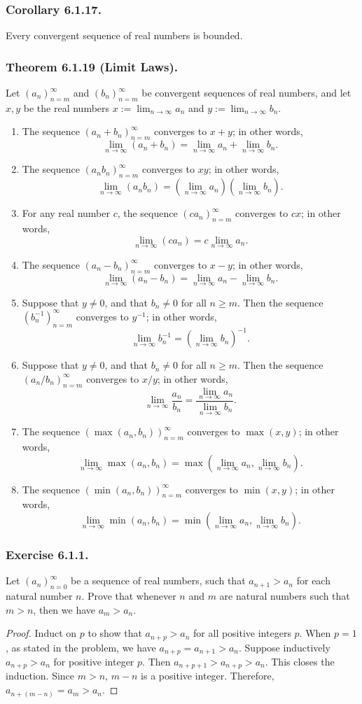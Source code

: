 \documentclass[12pt, letter]{article}
\newcommand{\la}{\lim_{n\to\infty}a_n}
\newcommand{\lb}{\lim_{n\to\infty}b_n}
\begin{document}
\subsubsection*{Corollary 6.1.17.}
Every convergent sequence of real numbers is bounded.
\subsubsection*{Theorem 6.1.19 (Limit Laws).}
Let $(a_n)_{n=m}^\infty$ and $(b_n)_{n=m}^\infty$ be convergent sequences of real numbers, and let $x,y$ be the real numbers $x:=\la$ and $y:=\lb$.
\begin{enumerate}[label=(\alph*)]
    \item  The sequence $(a_n+b_n)_{n=m}^\infty$ converges to $x+y$; in other words, $$\lim_{n\to\infty}(a_n+b_n)=\la+\lb.$$
    \item The sequence $(a_n b_n)_{n=m}^\infty$ converges to $xy$; in other words, $$\lim_{n\to\infty}(a_n b_n)=(\la)(\lb).$$
    \item For any real number $c$, the sequence $(ca_n)_{n=m}^\infty$ converges to $cx$; in other words, $$\lim_{n\to\infty}(ca_n)=c\la.$$
    \item The sequence $(a_n-b_n)_{n=m}^\infty$ converges to $x-y$; in other words, $$\lim_{n\to\infty}(a_n-b_n)=\la - \lb.$$
    \item Suppose that $y\ne 0$, and that $b_n\ne 0$ for all $n\geq m$. Then the sequence $(b_n^{-1})_{n=m}^\infty$ converges to $y^{-1}$; in other words,
    $$\lim_{n\to\infty}b_n^{-1}=(\lb)^{-1}.$$
    \item Suppose that $y\ne 0$, and that $b_n\ne 0$ for all $n\geq m$. Then the sequence $(a_n/b_n)_{n=m}^\infty$ converges to $x/y$; in other words,
    $$\lim_{n\to\infty}\frac{a_n}{b_n}=\frac{\la}{\lb}.$$
    \item The sequence $(\max(a_n,b_n))_{n=m}^\infty$ converges to $\max(x,y)$; in other words, $$\lim_{n\to\infty} \max(a_n,b_n)=\max(\la, \lb).$$
    \item The sequence $(\min(a_n,b_n))_{n=m}^\infty$ converges to $\min(x,y)$; in other words, $$\lim_{n\to\infty}\min(a_n,b_n)=\min (\la,\lb).$$
\end{enumerate}
\subsubsection*{Exercise 6.1.1.}
Let $(a_n)_{n=0}^\infty$ be a sequence of real numbers, such that $a_{n+1}>a_n$ for each natural number $n$. Prove that whenever $n$ and $m$ are natural numbers such that 
$m>n$, then we have $a_m>a_n$.
\begin{proof}
    Induct on $p$ to show that $a_{n+p}>a_n$ for all positive integers $p$. When $p=1$, as stated in the problem, we have $a_{n+p}=a_{n+1}>a_n$. Suppose inductively
    $a_{n+p}>a_n$ for positive integer $p$. Then $a_{n+p+1}>a_{n+p}>a_n$. This closes the induction. Since $m>n$, $m-n$ is a positive integer. Therefore, $a_{n+(m-n)}=a_m>a_n$.
\end{proof}
\end{document}
